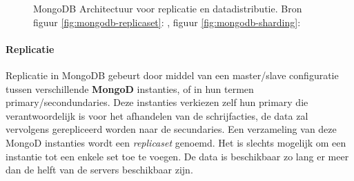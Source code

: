 \begin{figure}[h!] 
\centering
	\hfill
	\caption{MongoDB Architectuur voor replicatie en datadistributie. Bron figuur \ref{fig:mongodb-replicaset}: \cite{mongodb-replicaset}, figuur \ref{fig:mongodb-sharding}: \cite{mongodb-shard}}
	\label{fig:mongodb-architectuur}
\end{figure}

\paragraph{Replicatie\cite{mongodb-replicaset}} Replicatie in MongoDB gebeurt door middel van een master/slave configuratie tussen verschillende \textbf{MongoD} instanties, of in hun termen primary/secondundaries. Deze instanties verkiezen zelf hun primary die verantwoordelijk is voor het afhandelen van de schrijfacties, de data zal vervolgens gerepliceerd worden naar de secundaries. Een verzameling van deze MongoD instanties wordt een \textit{replicaset} genoemd. Het is slechts mogelijk om een instantie tot een enkele set toe te voegen. De data is beschikbaar zo lang er meer dan de helft van de servers beschikbaar zijn. 

